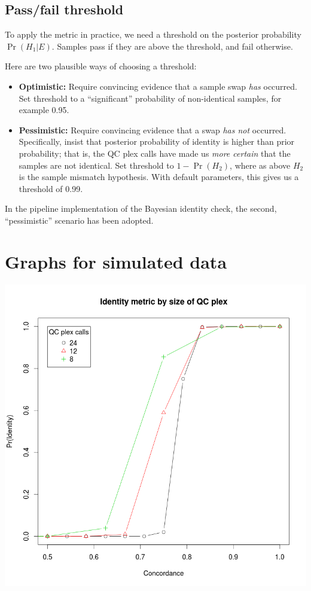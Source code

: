 \documentclass{article}
\begin{document}
\subsection*{Pass/fail threshold}

To apply the metric in practice, we need a threshold on the posterior probability $\Pr(H_1|E)$. Samples pass if they are above the threshold, and fail otherwise.

Here are two plausible ways of choosing a threshold:

\begin{itemize}
\item \textbf{Optimistic:} Require convincing evidence that a sample swap \emph{has} occurred. Set threshold to a ``significant'' probability of non-identical samples, for example 0.95.
\item \textbf{Pessimistic:} Require convincing evidence that a swap \emph{has not} occurred. Specifically, insist that posterior probability of identity is higher than prior probability; that is, the QC plex calls have made us \emph{more certain} that the samples are not identical. Set threshold to $1 - \Pr(H_2)$, where as above $H_2$ is the sample mismatch hypothesis. With default parameters, this gives us a threshold of 0.99.
\end{itemize}

In the pipeline implementation of the Bayesian identity check, the second, ``pessimistic'' scenario has been adopted.

\section{Graphs for simulated data}

\includegraphics[scale=0.5]{identity_by_plex_size}
\end{document}
